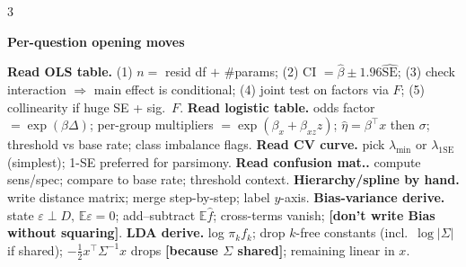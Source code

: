 \documentclass[a4paper,8pt]{extarticle}
\renewcommand{\section}[1]{\par\vspace{2pt}\noindent\colorbox{black!15}{\parbox{0.97\linewidth}{\strut\bfseries\small #1}}\par\vspace{1pt}}
\newcommand{\hd}[1]{\textbf{#1.}}
\newcommand{\tr}[1]{\textcolor{red!70!black}{\textbf{[#1]}}} %
\newcommand{\E}{\mathbb{E}}
\begin{document}
\begin{multicols*}{3}
\section{Per-question opening moves}
\hd{Read OLS table} (1) $n=$ resid df $+$ \#params; (2) CI $=\hat\beta\pm1.96\widehat{\text{SE}}$; (3) check interaction $\Rightarrow$ main effect is conditional; (4) joint test on factors via $F$; (5) collinearity if huge SE + sig.\ $F$.
\hd{Read logistic table} odds factor $=\exp(\beta\Delta)$; per-group multipliers $=\exp(\beta_x+\beta_{xz}z)$; $\hat\eta=\beta^\top x$ then $\sigma$; threshold vs base rate; class imbalance flags.
\hd{Read CV curve} pick $\lambda_{\min}$ or $\lambda_{1\text{SE}}$ (simplest); 1-SE preferred for parsimony.
\hd{Read confusion mat.} compute sens/spec; compare to base rate; threshold context.
\hd{Hierarchy/spline by hand} write distance matrix; merge step-by-step; label $y$-axis.
\hd{Bias-variance derive} state $\varepsilon\!\perp\!D,\,\E\varepsilon\!=\!0$; add--subtract $\E\hat f$; cross-terms vanish; \tr{don't write Bias without squaring}.
\hd{LDA derive} log $\pi_k f_k$; drop $k$-free constants (incl.\ $\log|\Sigma|$ if shared); $-\tfrac12 x^\top\Sigma^{-1}x$ drops \tr{because $\Sigma$ shared}; remaining linear in $x$.

\end{multicols*}
\end{document}
